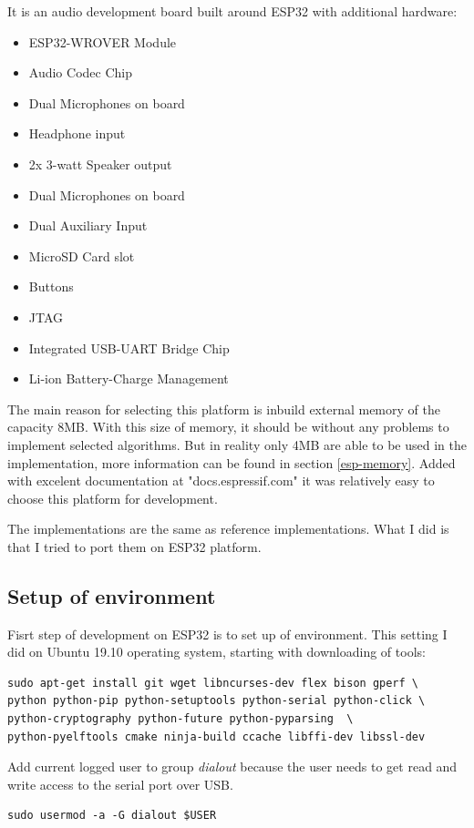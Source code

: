 \documentclass[thesis=M,english]{FITthesis}[2019/12/23]
\begin{document}
It is an audio development board built around ESP32 with additional hardware:
\begin{itemize}
\item	ESP32-WROVER Module
\item	Audio Codec Chip
\item	Dual Microphones on board
\item	Headphone input
\item	2x 3-watt Speaker output
\item	Dual Microphones on board
\item	Dual Auxiliary Input
\item	MicroSD Card slot
\item	Buttons
\item	JTAG
\item	Integrated USB-UART Bridge Chip
\item	Li-ion Battery-Charge Management
\end{itemize}

The main reason for selecting this platform is inbuild external memory of the capacity 8MB. With this size of memory, it should be without any problems to implement selected algorithms. But in reality only 4MB are able to be used in the implementation, more information can be found in section \ref{esp-memory}. Added with excelent documentation at "docs.espressif.com" it was relatively easy to choose this platform for development.

\bigskip
\noindent
The implementations are the same as reference implementations. What I did is that I tried to port them on ESP32 platform.

\subsection{Setup of environment}
Fisrt step of development on ESP32 is to set up of environment. This setting I did on Ubuntu 19.10 operating system, starting with downloading of tools:
\begin{lstlisting}[frame=single]
sudo apt-get install git wget libncurses-dev flex bison gperf \
python python-pip python-setuptools python-serial python-click \
python-cryptography python-future python-pyparsing  \
python-pyelftools cmake ninja-build ccache libffi-dev libssl-dev
\end{lstlisting}

\bigskip
\noindent
Add current logged user to group \textit{dialout} because the user needs to get read and write access to the serial port over USB.
\begin{lstlisting}[frame=single]
sudo usermod -a -G dialout $USER
\end{lstlisting}
\end{document}
